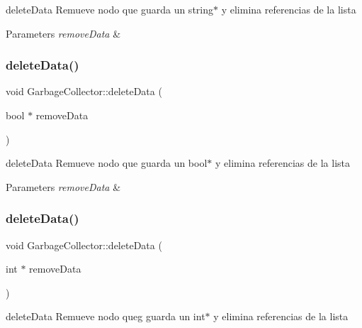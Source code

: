 delete\+Data Remueve nodo que guarda un string$\ast$ y elimina referencias de la lista 


\begin{DoxyParams}{Parameters}
{\em remove\+Data} & \\
\hline
\end{DoxyParams}
\mbox{\label{class_garbage_collector_aaa6a0a08399c3ab0a8ec4b113a468bb6}} 
\subsubsection{\texorpdfstring{delete\+Data()}{deleteData()}\hspace{0.1cm}{\footnotesize\ttfamily [2/3]}}
{\footnotesize\ttfamily void Garbage\+Collector\+::delete\+Data (\begin{DoxyParamCaption}\item[{bool $\ast$}]{remove\+Data }\end{DoxyParamCaption})}



delete\+Data Remueve nodo que guarda un bool$\ast$ y elimina referencias de la lista 


\begin{DoxyParams}{Parameters}
{\em remove\+Data} & \\
\hline
\end{DoxyParams}
\mbox{\label{class_garbage_collector_a47919d7aa5bc81d22cc714d5d5bf4e29}} 
\subsubsection{\texorpdfstring{delete\+Data()}{deleteData()}\hspace{0.1cm}{\footnotesize\ttfamily [3/3]}}
{\footnotesize\ttfamily void Garbage\+Collector\+::delete\+Data (\begin{DoxyParamCaption}\item[{int $\ast$}]{remove\+Data }\end{DoxyParamCaption})}



delete\+Data Remueve nodo queg guarda un int$\ast$ y elimina referencias de la lista 


